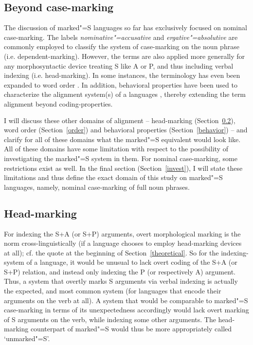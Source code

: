 \subsection{Beyond case-marking}
The discussion of marked"=S languages so far has exclusively focused on nominal case-marking.
The labels \textit{nominative"=accusative} and \textit{ergative"=absolutive} are commonly employed to classify the system of case-marking on the noun phrase (i.e. de\-pen\-dent-marking). 
However, the terms are also applied more generally for any morphosyntactic device treating S like A or P, and thus including verbal indexing (i.e. head-marking). 
In some instances, the terminology has even been expanded to word order \citep{Buth:1981, Andersen:1988}. %
In addition, behavioral properties have been used to characterize the alignment system(s) of a languages \citep{Bickel.align}, thereby extending the term alignment beyond coding-properties.

I will discuss these other domains of alignment -- head-marking (Section~\ref{head}), word order (Section~\ref{order}) and behavioral properties (Section~\ref{behavior}) -- and clarify for all of these domains what the marked"=S equivalent would look like. 
All of these domains have some limitation with respect to the possibility of investigating the marked"=S system in them. 
For nominal case-marking, some restrictions exist as well. 
In the final section (Section~\ref{invest}), I will state these limitations and thus define the exact domain of this study on marked"=S languages, namely, nominal case-marking of full noun phrases.

\subsection{Head-marking}\label{head}

For indexing the S+A (or S+P) arguments, overt morphological marking is the norm cross-linguistically (if a language chooses to employ head-marking devices at all); cf. the \citet{Chomsky:1993} quote at the beginning of Section~\ref{theoretical}.
So for the indexing-system of a language, it would be unusual to lack overt coding of the S+A (or S+P) relation, and instead only indexing the P (or respectively A) argument.
Thus, a system that overtly marks S arguments via verbal indexing is actually the expected, and most common system (for languages that encode their arguments on the verb at all). 
A system that would be comparable to marked"=S case-marking in terms of its unexpectedness accordingly would lack overt marking of S arguments on the verb, while indexing some other arguments. 
The head-marking counterpart of marked"=S would thus be more appropriately called `unmarked"=S'.    
\enlargethispage{\baselineskip}

